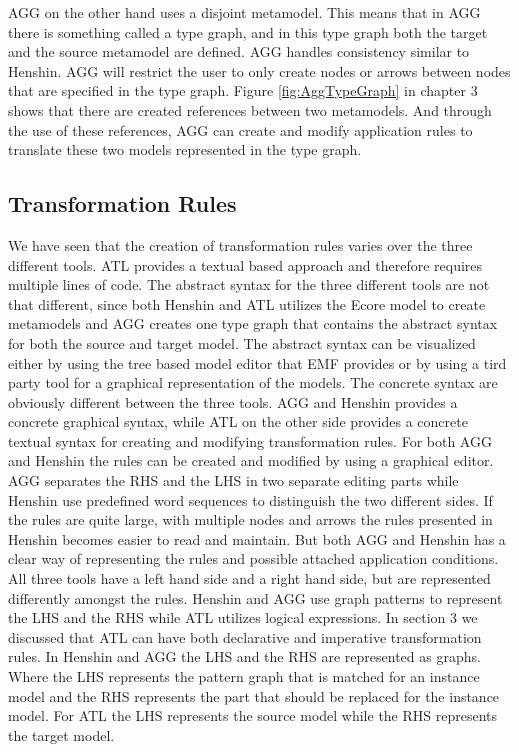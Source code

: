 AGG on the other hand uses a disjoint metamodel. This means that in AGG there
is something called a type graph, and in this type graph both the target and
the source metamodel are defined. AGG handles consistency similar to
Henshin. AGG will restrict the user to only create nodes or arrows between
nodes that are specified in the type graph. Figure \ref{fig:AggTypeGraph}
in chapter 3 shows that there are created references between two metamodels. And
through the use of these references, AGG can create and modify application
rules to translate these two models represented in the type graph. 
 
\subsection{Transformation Rules}
We have seen that the creation of transformation rules varies over the three
different tools. ATL provides a textual based approach and therefore requires
multiple lines of code. The abstract syntax for the three different tools are
not that different, since both Henshin and ATL utilizes the Ecore model to
create metamodels and AGG creates one type graph that contains the abstract
syntax for both the source and target model. The abstract syntax can be
visualized either by using the tree based model editor that EMF provides or by
using a tird party tool for a graphical representation of the models. The
concrete syntax are obviously different between the three tools. AGG and Henshin
provides a concrete graphical syntax, while ATL on the other side provides a
concrete textual syntax for creating and modifying transformation rules. For
both AGG and Henshin the rules can be created and modified by using a graphical
editor. AGG separates the RHS and the LHS in two separate editing parts while
Henshin use predefined word sequences to distinguish the two different sides.
If the rules are quite large, with multiple nodes and arrows the rules
presented in Henshin becomes easier to read and maintain. But both AGG and
Henshin has a clear way of representing the rules and possible attached
application conditions. All three tools have a left hand side
and a right hand side, but are represented differently amongst the rules.
Henshin and AGG use graph patterns to represent the LHS and the RHS while ATL
utilizes logical expressions. In section 3 we discussed that ATL can have both
declarative and imperative transformation rules. In Henshin and AGG the LHS and
the RHS are represented as graphs. Where the LHS represents the pattern graph
that is matched for an instance model and the RHS represents the part that should be
replaced for the instance model. For ATL the LHS represents the source model
while the RHS represents the target model. 

